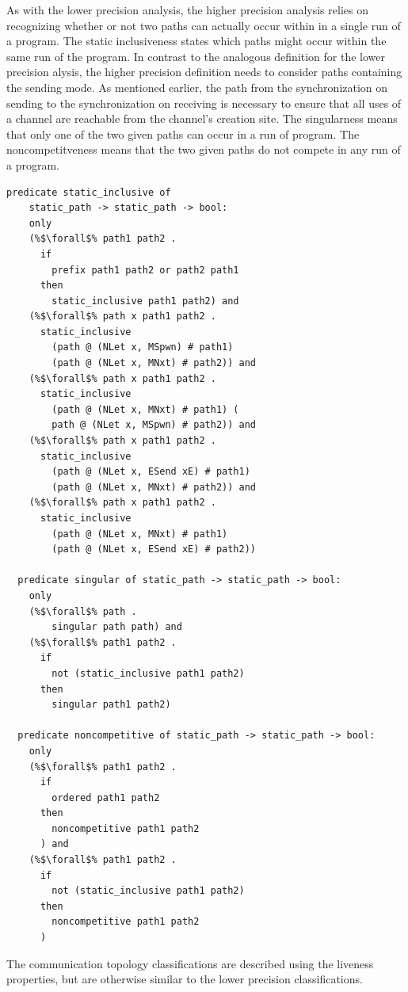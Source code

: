 \documentclass{article}
\begin{document}
As with the lower precision analysis, the higher precision analysis relies on recognizing
whether or not two paths can actually occur within in a single run of a program. The static
inclusiveness states which paths might occur within the same run of the program.
In contrast to the analogous definition for the lower precision
alysis, the higher precision definition needs to consider paths containing the
sending mode.  As mentioned earlier, the path from the synchronization on sending to the
synchronization on receiving is necessary to ensure that all uses of a channel are reachable
from the channel's creation site.  The singularness means that only one of the two
given paths can occur in a run of program.  The noncompetitveness means that the two
given paths do not compete in any run of a program. 

\begin{lstlisting}[language=logic, escapechar=\%]
  predicate static_inclusive of
    static_path -> static_path -> bool:
    only
    (%$\forall$% path1 path2 .
      if
        prefix path1 path2 or path2 path1
      then
        static_inclusive path1 path2) and
    (%$\forall$% path x path1 path2 .
      static_inclusive
        (path @ (NLet x, MSpwn) # path1)
        (path @ (NLet x, MNxt) # path2)) and
    (%$\forall$% path x path1 path2 .
      static_inclusive
        (path @ (NLet x, MNxt) # path1) (
        path @ (NLet x, MSpwn) # path2)) and
    (%$\forall$% path x path1 path2 .
      static_inclusive
        (path @ (NLet x, ESend xE) # path1)
        (path @ (NLet x, MNxt) # path2)) and
    (%$\forall$% path x path1 path2 .
      static_inclusive
        (path @ (NLet x, MNxt) # path1)
        (path @ (NLet x, ESend xE) # path2))

  predicate singular of static_path -> static_path -> bool:
    only 
    (%$\forall$% path .
        singular path path) and
    (%$\forall$% path1 path2 .
      if
        not (static_inclusive path1 path2)
      then
        singular path1 path2)

  predicate noncompetitive of static_path -> static_path -> bool:
    only
    (%$\forall$% path1 path2 . 
      if
        ordered path1 path2
      then
        noncompetitive path1 path2
      ) and
    (%$\forall$% path1 path2 .
      if
        not (static_inclusive path1 path2)
      then
        noncompetitive path1 path2
      )
  \end{lstlisting}

The communication topology classifications are described using the liveness properties, but
are otherwise similar to the lower precision classifications.
\end{document}
